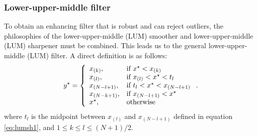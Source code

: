      \subsubsection{Lower-upper-middle filter}

To obtain an enhancing filter that is robust and can reject outliers,
the philosophies of the lower-upper-middle (LUM)
smoother and lower-upper-middle (LUM) sharpener must be
combined. This leads us to the general
lower-upper-middle (LUM) filter. A direct definition is
as follows: 
\begin{equation} 
  y^{\star} = \left\{
\begin{array}{ll} x_{(k)}, & \textrm{if $ x^{\star} < x_{(k)}$}\\ x_{(l)}, &
\textrm{if $ x_{(l)} < x^{\star} < t_l$}\\ x_{(N-l+1)}, & \textrm{if $ t_l <
x^{\star} < x_{(N-l+1)}$}\\ x_{(N-k+1)}, & \textrm{if $ x_{(N-l+1)} <
x^{\star}$}\\ x^{\star}, & \textrm{otherwise}
\end{array} \right..
  \label{eq:lum5} 
\end{equation}
where $t_l$ is the midpoint between $x_{(l)}$ and $x_{(N-l+1)}$
defined in equation
\ref{eq:lumsh1}, and  $1 \le k \le l \le (N+1)/2$.




%


